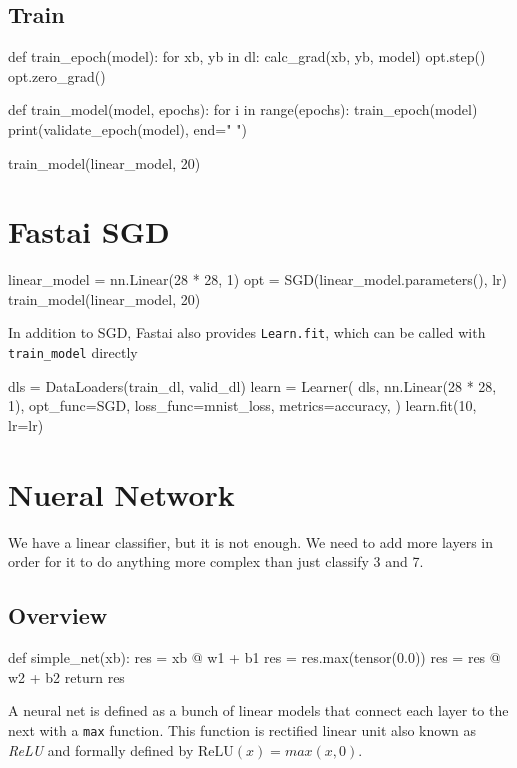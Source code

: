 \documentclass{article}
\newenvironment{monos}{\VerbatimEnvironment\begin{pythoncode}}{\end{pythoncode}}
\begin{document}
\subsection{Train}

\begin{monos}
    def train_epoch(model):
    for xb, yb in dl:
        calc_grad(xb, yb, model)
        opt.step()
        opt.zero_grad()


def train_model(model, epochs):
    for i in range(epochs):
        train_epoch(model)
        print(validate_epoch(model), end=" ")


train_model(linear_model, 20)
\end{monos}

\section{Fastai SGD}

\begin{monos}
linear_model = nn.Linear(28 * 28, 1)
opt = SGD(linear_model.parameters(), lr)
train_model(linear_model, 20)
\end{monos}

In addition to SGD, Fastai also provides \verb!Learn.fit!, which can be called with
\verb!train_model! directly

\begin{monos}
dls = DataLoaders(train_dl, valid_dl)
learn = Learner(
    dls,
    nn.Linear(28 * 28, 1),
    opt_func=SGD,
    loss_func=mnist_loss,
    metrics=accuracy,
)
learn.fit(10, lr=lr)
\end{monos}

\section{Nueral Network}

We have a linear classifier, but it is not enough. We need to add more layers in order
for it to do anything more complex than just classify 3 and 7.

\subsection{Overview}

\begin{monos}
def simple_net(xb):
    res = xb @ w1 + b1
    res = res.max(tensor(0.0))
    res = res @ w2 + b2
    return res
\end{monos}

A neural net is defined as a bunch of linear models that connect each layer to the next
with a \verb!max! function. This function is rectified linear unit also known as
\textit{ReLU} and formally defined by $\textrm{ReLU}(x) = max(x, 0)$.
\end{document}

